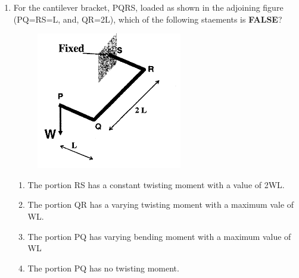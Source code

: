 \documentclass[journal,12pt,onecolumn]{IEEEtran}
\theoremstyle{remark}
\begin{document}
\begin{enumerate}
\item For the cantilever bracket, PQRS, loaded as shown in the adjoining figure (PQ=RS=L, and, QR=2L), which of the following staements is \textbf{FALSE}?
\begin{figure}[ht]
\centering
\includegraphics[scale=0.4]{figs/fig2.png}
\end{figure}
	\begin{enumerate}
		\item The portion RS has a constant twisting moment with a value of 2WL.
		\item The portion QR has a varying twisting moment with a maximum vale of WL.
		\item The portion PQ has varying bending moment with a maximum value of WL
		\item The portion PQ has no twisting moment.
	\end{enumerate}


\end{enumerate}
\end{document}
